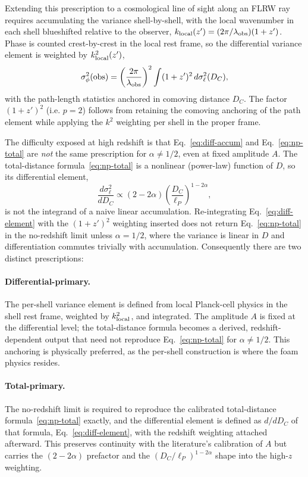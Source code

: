 \documentclass[aps,prd,onecolumn,amsmath,amssymb]{revtex4-2}
\begin{document}
Extending this prescription to a cosmological line of sight along an FLRW ray
requires accumulating the variance shell-by-shell, with the local wavenumber
in each shell blueshifted relative to the observer,
$k_{\rm local}(z') = (2\pi/\lambda_{\rm obs})(1+z')$. Phase is counted
crest-by-crest in the local rest frame, so the differential variance element
is weighted by $k_{\rm local}^2(z')$,
\begin{equation}
  \sigma_\phi^2(\text{obs})
  = \left(\frac{2\pi}{\lambda_{\rm obs}}\right)^2
    \int (1+z')^2 \, d\sigma_\ell^2(D_C),
  \label{eq:diff-accum}
\end{equation}
with the path-length statistics anchored in comoving distance $D_C$. The
factor $(1+z')^2$ (i.e. $p=2$) follows from retaining the comoving anchoring of
the path element while applying the $k^2$ weighting per shell in the proper
frame.

The difficulty exposed at high redshift is that
Eq.~\eqref{eq:diff-accum} and Eq.~\eqref{eq:np-total} are \emph{not} the same
prescription for $\alpha \neq 1/2$, even at fixed amplitude $A$. The
total-distance formula~\eqref{eq:np-total} is a nonlinear (power-law) function
of $D$, so its differential element,
\begin{equation}
  \frac{d\sigma_\ell^2}{dD_C}
  \propto (2-2\alpha)\left(\frac{D_C}{\ell_P}\right)^{1-2\alpha},
  \label{eq:diff-element}
\end{equation}
is not the integrand of a naive linear accumulation. Re-integrating
Eq.~\eqref{eq:diff-element} with the $(1+z')^2$ weighting inserted does not
return Eq.~\eqref{eq:np-total} in the no-redshift limit unless $\alpha=1/2$,
where the variance is linear in $D$ and differentiation commutes trivially with
accumulation. Consequently there are two distinct prescriptions:

\paragraph{Differential-primary.} The per-shell variance element is defined
from local Planck-cell physics in the shell rest frame, weighted by
$k_{\rm local}^2$, and integrated. The amplitude $A$ is fixed at the
differential level; the total-distance formula becomes a derived,
redshift-dependent output that need not reproduce Eq.~\eqref{eq:np-total} for
$\alpha\neq 1/2$. This anchoring is physically preferred, as the per-shell
construction is where the foam physics resides.

\paragraph{Total-primary.} The no-redshift limit is required to reproduce the
calibrated total-distance formula~\eqref{eq:np-total} exactly, and the
differential element is defined as $d/dD_C$ of that formula,
Eq.~\eqref{eq:diff-element}, with the redshift weighting attached afterward.
This preserves continuity with the literature's calibration of $A$ but carries
the $(2-2\alpha)$ prefactor and the $(D_C/\ell_P)^{1-2\alpha}$ shape into the
high-$z$ weighting.
\end{document}
